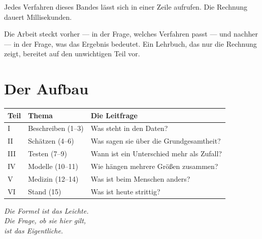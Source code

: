\begin{warnung}
Jedes Verfahren dieses Bandes lässt sich in einer Zeile aufrufen. Die Rechnung dauert Millisekunden.

Die Arbeit steckt vorher --- in der Frage, welches Verfahren passt --- und nachher --- in der Frage, was das Ergebnis bedeutet. Ein Lehrbuch, das nur die Rechnung zeigt, bereitet auf den unwichtigen Teil vor.

\begin{center}
\begin{minipage}{0.88\textwidth}
\end{minipage}
\end{center}
\end{warnung}

\section*{Der Aufbau}

\begin{merksatz}
\begin{center}
{\small
\renewcommand{\arraystretch}{1.45}
\begin{tabular}{@{}P{1.0cm}P{3.2cm}P{4.4cm}@{}}
\toprule
\textbf{Teil} & \textbf{Thema} & \textbf{Die Leitfrage}\\
\midrule
I & Beschreiben (1--3) & Was steht in den Daten?\\
II & Schätzen (4--6) & Was sagen sie über die Grundgesamtheit?\\
III & Testen (7--9) & Wann ist ein Unterschied mehr als Zufall?\\
IV & Modelle (10--11) & Wie hängen mehrere Größen zusammen?\\
V & Medizin (12--14) & Was ist beim Menschen anders?\\
VI & Stand (15) & Was ist heute strittig?\\
\bottomrule
\end{tabular}}
\end{center}
\end{merksatz}

\vspace{10pt}
\begin{flushright}
\itshape\color{grau}
Die Formel ist das Leichte.\\
Die Frage, ob sie hier gilt,\\
ist das Eigentliche.
\end{flushright}
